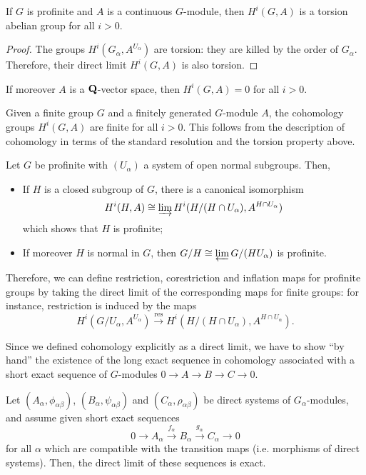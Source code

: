 \documentclass{article}
\begin{document}
\begin{prop}
		If $G$ is profinite and $A$ is a continuous $G$-module, then $H^i(G,A)$ is a torsion abelian group for all $i>0$.
\end{prop}
\begin{proof}
		The groups $H^i(G_\alpha,A^{U_\alpha})$ are torsion: they are killed by the order of $G_\alpha$. Therefore, their direct limit $H^i(G,A)$ is also torsion.
\end{proof}
\begin{cor}
		If moreover $A$ is a $\mathbf{Q}$-vector space, then $H^i(G,A)=0$ for all $i>0$.
\end{cor}
\begin{rmk}
		Given a finite group $G$ and a finitely generated $G$-module $A$, the cohomology groups $H^i(G,A)$ are finite for all $i>0$. This follows from the description of cohomology in terms of the standard resolution and the torsion property above.
\end{rmk}

\begin{lem}
		Let $G$ be profinite with $(U_\alpha)$ a system of open normal subgroups. Then,
		\begin{itemize}
			\item If $H$ is a closed subgroup of $G$, there is a canonical isomorphism
			\[
				H^i(H,A) \cong \varinjlim H^i(H/(H\cap U_\alpha),A^{H\cap U_\alpha})
			\]
			which shows that $H$ is profinite;
			\item If moreover $H$ is normal in $G$, then $G/H\cong \varprojlim G/(HU_\alpha)$ is profinite.
		\end{itemize}
	\end{lem}
Therefore, we can define restriction, corestriction and inflation maps for profinite groups by taking the direct limit of the corresponding maps for finite groups: for instance, restriction is induced by the maps
\[
	H^i(G/U_\alpha,A^{U_\alpha}) \xrightarrow{\operatorname{res}} H^i(H/(H\cap U_\alpha),A^{H\cap U_\alpha}).
\]

Since we defined cohomology explicitly as a direct limit, we have to show ``by hand'' the existence of the long exact sequence in cohomology associated with a short exact sequence of $G$-modules $0\to A\to B\to C\to 0$.

\begin{lem}
		Let $(A_\alpha,\phi_{\alpha\beta})$, $(B_\alpha,\psi_{\alpha\beta})$ and $(C_\alpha,\rho_{\alpha\beta})$ be direct systems of $G_\alpha$-modules, and assume given short exact sequences
		\[
			0 \to A_\alpha \xrightarrow{f_\alpha} B_\alpha \xrightarrow{g_\alpha} C_\alpha \to 0
		\]
		for all $\alpha$ which are compatible with the transition maps (i.e. morphisms of direct systems). Then, the direct limit of these sequences is exact.
\end{lem}
\end{document}
